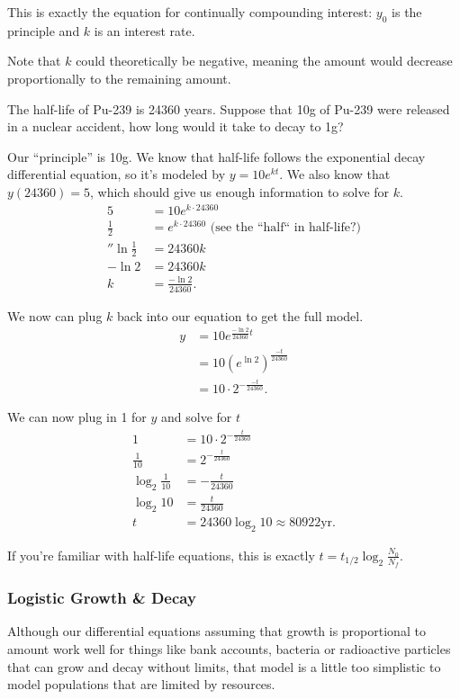 This is exactly the equation for continually compounding interest: $y_0$ is the principle and $k$ is an interest rate.


Note that $k$ could theoretically be negative, meaning the amount would decrease proportionally to the remaining amount.
\begin{example}
	The half-life of Pu-239 is 24360 years.
	Suppose that 10g of Pu-239 were released in a nuclear accident, how long would it take to decay to 1g?
\end{example}
\begin{answer}
	Our ``principle'' is 10g.
	We know that half-life follows the exponential decay differential equation, so it's modeled by $y = 10e^{kt}$.
	We also know that $y(24360)=5$, which should give us enough information to solve for $k$.
	\begin{align*}
		5 &= 10e^{k\cdot 24360} \\
		\frac{1}{2} &= e^{k\cdot 24360} \text{ (see the ``half`` in half-life?)} \\
''		\ln{\frac{1}{2}} &= 24360k \\
		-\ln{2} &= 24360k \\
		k &= \frac{-\ln{2}}{24360}.
	\end{align*}
	
	We now can plug $k$ back into our equation to get the full model.
	\begin{align*}
		y &= 10e^{\frac{-\ln{2}}{24360}t} \\
		&= 10\left(e^{\ln{2}}\right)^{\frac{-t}{24360}} \\
		&= 10\cdot2^{-\frac{-t}{24360}}.
	\end{align*}
	
	We can now plug in 1 for $y$ and solve for $t$
	\begin{align*}
		1 &= 10\cdot2^{-\frac{t}{24360}} \\
		\frac{1}{10} &= 2^{-\frac{t}{24360}} \\
		\log_{2}{\frac{1}{10}} &= -\frac{t}{24360} \\
		\log_{2}{10} &= \frac{t}{24360} \\
		t &= 24360\log_{2}{10} \approx 80922\text{yr}.
	\end{align*}
	
	If you're familiar with half-life equations, this is exactly $t=t_{1/2}\log_{2}{\frac{N_0}{N_f}}$.
\end{answer}

\subsubsection{Logistic Growth \& Decay}
Although our differential equations assuming that growth is proportional to amount work well for things like bank accounts, bacteria or radioactive particles that can grow and decay without limits, that model is a little too simplistic to model populations that are limited by resources.

